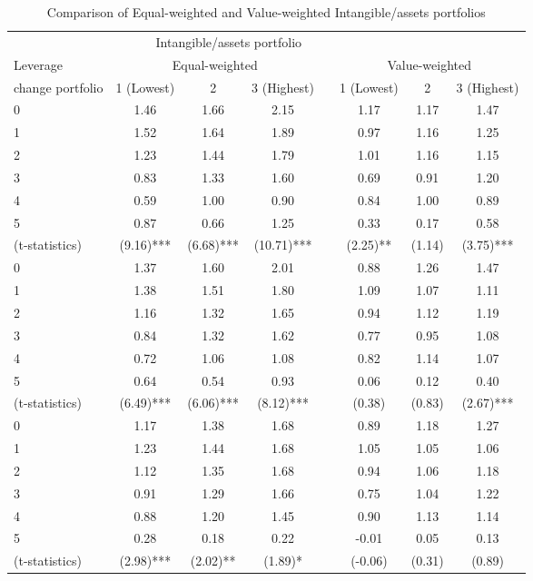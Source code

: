 

\begin{table}
\centering
\small
\setlength{\tabcolsep}{3pt} %
\begin{tabular*}{\textwidth}{@{\extracolsep{\fill}}l*{3}{c}l*{3}{c}}
\toprule
\multicolumn{7}{c}{Intangible/assets portfolio} \\
\cmidrule(r){2-4} \cmidrule(l){5-7}
Leverage & \multicolumn{3}{c}{Equal-weighted} & & \multicolumn{3}{c}{Value-weighted} \\
\cmidrule(r){2-4} \cmidrule(l){5-7}
change portfolio & 1 (Lowest) & 2 & 3 (Highest) & & 1 (Lowest) & 2 & 3 (Highest) \\
\midrule
0 & 1.46 & 1.66 & 2.15 & & 1.17 & 1.17 & 1.47 \\
1 & 1.52 & 1.64 & 1.89 & & 0.97 & 1.16 & 1.25 \\
2 & 1.23 & 1.44 & 1.79 & & 1.01 & 1.16 & 1.15 \\
3 & 0.83 & 1.33 & 1.60 & & 0.69 & 0.91 & 1.20 \\
4 & 0.59 & 1.00 & 0.90 & & 0.84 & 1.00 & 0.89 \\
5 & 0.87 & 0.66 & 1.25 & & 0.33 & 0.17 & 0.58 \\
(t-statistics) & (9.16)*** & (6.68)*** & (10.71)*** & & (2.25)** & (1.14) & (3.75)*** \\
\midrule
0 & 1.37 & 1.60 & 2.01 & & 0.88 & 1.26 & 1.47 \\
1 & 1.38 & 1.51 & 1.80 & & 1.09 & 1.07 & 1.11 \\
2 & 1.16 & 1.32 & 1.65 & & 0.94 & 1.12 & 1.19 \\
3 & 0.84 & 1.32 & 1.62 & & 0.77 & 0.95 & 1.08 \\
4 & 0.72 & 1.06 & 1.08 & & 0.82 & 1.14 & 1.07 \\
5 & 0.64 & 0.54 & 0.93 & & 0.06 & 0.12 & 0.40 \\
(t-statistics) & (6.49)*** & (6.06)*** & (8.12)*** & & (0.38) & (0.83) & (2.67)*** \\
\midrule
0 & 1.17 & 1.38 & 1.68 & & 0.89 & 1.18 & 1.27 \\
1 & 1.23 & 1.44 & 1.68 & & 1.05 & 1.05 & 1.06 \\
2 & 1.12 & 1.35 & 1.68 & & 0.94 & 1.06 & 1.18 \\
3 & 0.91 & 1.29 & 1.66 & & 0.75 & 1.04 & 1.22 \\
4 & 0.88 & 1.20 & 1.45 & & 0.90 & 1.13 & 1.14 \\
5 & 0.28 & 0.18 & 0.22 & & -0.01 & 0.05 & 0.13 \\
(t-statistics) & (2.98)*** & (2.02)** & (1.89)* & & (-0.06) & (0.31) & (0.89) \\
\midrule

\bottomrule
\end{tabular*}
\caption{Comparison of Equal-weighted and Value-weighted Intangible/assets portfolios}
\label{table:comparison}
\end{table}
